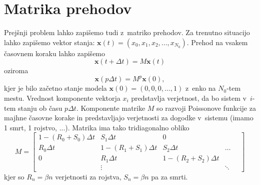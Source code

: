 \documentclass[a4paper,pdftex,11pt]{article}
\renewcommand{\vec}[1]{\boldsymbol{\mathbf{#1}}}
\numberwithin{figure}{section} %
\begin{document}
\section{Matrika prehodov}
Prejšnji problem lahko zapišemo tudi z~matriko prehodov. Za trenutno situacijo lahko 
zapišemo vektor stanja: $\vec{x}(t) = (x_0,x_1,x_2,...,x_{N_0})$. Prehod na vsakem časovnem
koraku lahko zapišemo
\begin{equation}
    \vec{x} (t+\Delta t) = M \vec{x} (t)
\end{equation}
oziroma
\begin{equation}
    \vec{x} (p \Delta t) = M^p \vec{x} (0),
\end{equation}
kjer je bilo začetno stanje modela $\vec{x}(0) = (0,0,0,\dots, 1)$ z~enko na $N_0$-tem
mestu. Vrednost komponente vektorja $x_i$ predstavlja verjetnost, da bo sistem v~$i$-tem 
stanju ob času $p \Delta t$. Komponente matrike $M$ so razvoji Poissonove funkcije za majhne
časovne korake in predstavljajo verjetnosti za dogodke v~sistemu (imamo 1 smrt, 
1 rojstvo, ...). Matrika ima tako tridiagonalno obliko
\begin{equation}
    M = 
    \begin{bmatrix}
	1 - (R_0 + S_0)\Delta t  & S_1\Delta t	& 0 \\
	R_0\Delta t  & 1 - (R_1 + S_1)\Delta t & S_2\Delta t & \dots \quad \\
	0 & R_1\Delta t  & 1 - (R_2 + S_2)\Delta t \\
	& \vdots & & \ddots
    \end{bmatrix}
\end{equation}
kjer so $R_n = \beta n$ verjetnosti za rojstva, $S_n = \beta n$ pa za smrti.
\pagebreak
\end{document}

